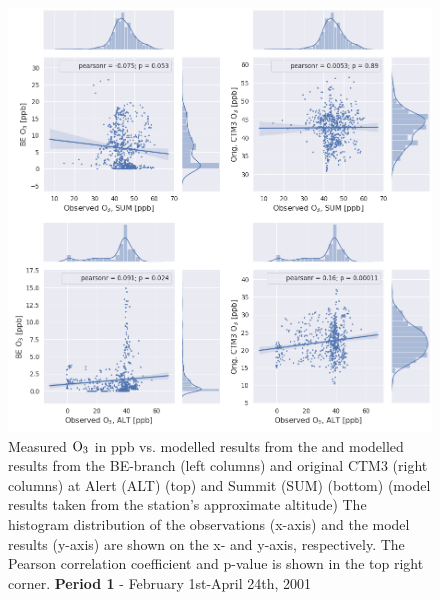\begin{figure}[ht]
    \centering
    \includegraphics[width = \linewidth]{Chapter6_Results/images/Orig_BE_comp/jointplot_FebApr_ALTSUM_O3_2001.png}
    \caption{Measured $\mathrm{O_3}$ in ppb vs. modelled results from the and modelled results from the BE-branch (left columns) and original CTM3 (right columns) at  Alert (ALT) (top) and Summit (SUM) (bottom) (model results taken from the station's approximate altitude) The histogram distribution of the observations (x-axis) and the model results (y-axis) are shown on the x- and y-axis, respectively. The Pearson correlation coefficient and p-value is shown in the top right corner. \textbf{Period 1} - February 1st-April 24th, 2001}
    \label{fig:joint_FebApr_ALTSUM}
\end{figure}